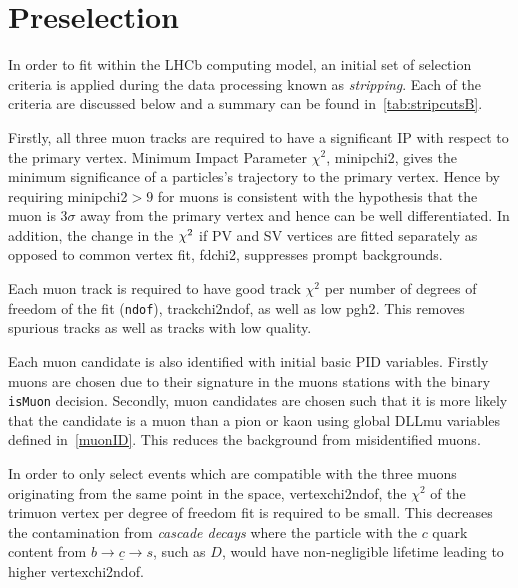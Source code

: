 \section{Preselection}%
\label{preselection}

In order to fit within the LHCb computing model, an initial set of selection criteria is applied during the data processing known as \textit{stripping}. Each of the criteria are discussed below and a summary can be found in~\autoref{tab:stripcutsB}.


Firstly, all three muon tracks are required to have a significant \gls{IP} with respect to the primary vertex. Minimum Impact Parameter $\chi^{2}$, \gls{minipchi2}, gives the minimum significance of a particles's trajectory to the primary vertex. Hence by requiring \gls{minipchi2}$>9$ for muons is consistent with the hypothesis that the muon is $3\sigma$ away from the primary vertex and hence can be well differentiated. In addition, the change in the $\chi^2$ if \gls{PV} and \gls{SV} vertices are fitted separately as opposed to common vertex fit, \gls{fdchi2}, suppresses prompt backgrounds. 

Each muon track is required to have good track $\chi^{2}$ per number of degrees of freedom of the fit (\texttt{ndof}), \gls{trackchi2ndof}, as well as low \gls{pgh2}. This removes spurious tracks as well as tracks with low quality.

Each muon candidate is also identified with initial basic \gls{PID} variables. Firstly muons are chosen due to their signature in the muons stations with the binary \texttt{isMuon} decision. Secondly, muon candidates are chosen such that it is more likely that the candidate is a muon than a pion or kaon using global DLLmu variables defined in~\autoref{muonID}. This reduces the background from misidentified muons.

In order to only select events which are compatible with the three muons originating from the same point in the space, \gls{vertexchi2ndof}, the $\chi^{2}$ of the trimuon vertex per degree of freedom fit is required to be small. This decreases the contamination from \textit{cascade decays} where the particle with the $c$ quark content from $b \rightarrow \underline{c} \rightarrow s$, such as $D$, would have non-negligible lifetime leading to higher \gls{vertexchi2ndof}. 

